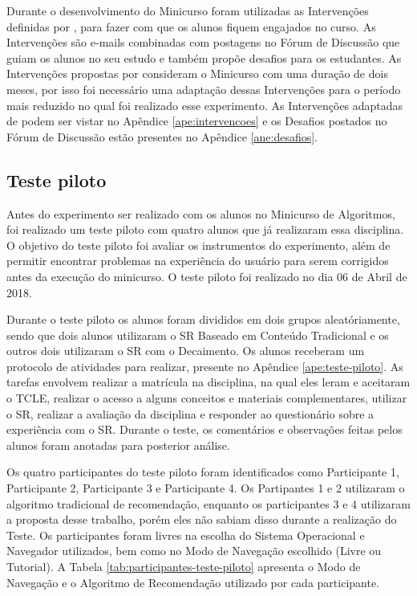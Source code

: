 Durante o desenvolvimento do Minicurso foram utilizadas as Intervenções definidas por , para
fazer com que os alunos fiquem engajados no curso. As Intervenções são e-mails combinadas com postagens no Fórum de Discussão
que guiam os alunos no seu estudo e também propõe desafios para os estudantes. As Intervenções propostas por 
consideram o Minicurso com uma duração de dois meses, por isso foi necessário uma adaptação dessas Intervenções para o período
mais reduzido no qual foi realizado esse experimento. As Intervenções adaptadas de  podem
ser vistar no Apêndice \ref{ape:intervencoes} e os Desafios postados no Fórum de Discussão estão presentes no Apêndice \ref{ane:desafios}.

\subsection{Teste piloto}\label{section:planejamento-teste-piloto}

Antes do experimento ser realizado com os alunos no Minicurso de Algoritmos, foi realizado um teste piloto com
quatro alunos que já realizaram essa disciplina. O objetivo do teste piloto foi avaliar os instrumentos do experimento,
além de permitir encontrar problemas na experiência do usuário para serem corrigidos antes da execução do minicurso. O teste piloto
foi realizado no dia 06 de Abril de 2018.

Durante o teste piloto os alunos foram divididos em dois grupos aleatóriamente, sendo que dois alunos utilizaram o SR
Baseado em Conteúdo Tradicional e os outros dois utilizaram o SR com o Decaimento. Os alunos receberam
um protocolo de atividades para realizar, presente no Apêndice \ref{ape:teste-piloto}. As tarefas envolvem
realizar a matrícula na disciplina, na qual eles leram e aceitaram o TCLE, realizar o acesso a alguns conceitos e
materiais complementares, utilizar o SR, realizar a avaliação da disciplina e responder ao questionário sobre a experiência
com o SR. Durante o teste, os comentários e observações feitas pelos alunos foram anotadas para posterior análise.

Os quatro participantes do teste piloto foram identificados como Participante 1, Participante 2,
Participante 3 e Participante 4. Os Partipantes 1 e 2 utilizaram o algoritmo tradicional de recomendação, enquanto os
participantes 3 e 4 utilizaram a proposta desse trabalho, porém eles não sabiam disso durante a realização do Teste. Os
participantes foram livres na escolha do Sistema Operacional e Navegador utilizados, bem como no Modo de Navegação
escolhido (Livre ou Tutorial). A Tabela \ref{tab:participantes-teste-piloto} apresenta o Modo de Navegação e o Algoritmo
de Recomendação utilizado por cada participante.

